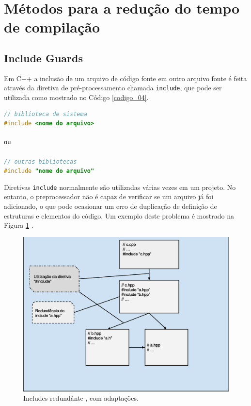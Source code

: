 \section{Métodos para a redução do tempo de compilação}

\subsection{Include Guards}\label{include_guards_section}

Em C++ a inclusão de um arquivo de código fonte em outro arquivo fonte é feita
 através da diretiva de pré-processamento chamada \texttt{include}, que pode 
ser utilizada como mostrado no Código \ref{codigo_04}. 

\begin{lstlisting}[language=C++,caption={Diretiva de 
                           pré-processamento para inclusão de arquivo},
                                                   label=codigo_04]
// biblioteca de sistema 
#include <nome do arquivo>  

ou

// outras bibliotecas 
#include "nome do arquivo"  

\end{lstlisting}


Diretivas \texttt{include} normalmente são utilizadas várias vezes em um projeto.
 No entanto, o preprocessador não é capaz de verificar se um arquivo já foi
 adicionado, o que pode ocasionar um erro de duplicação de definição de
 estruturas e elementos do código. Um exemplo deste problema é mostrado na
 Figura \ref{fig07} \cite[pág. 57]{ref39}.

\begin{figure}[h]
    \centering
        \includegraphics[keepaspectratio=true,scale=0.55]{figuras/multi_include.eps}
    \caption{Includes redundânte \cite[pág.  80]{ref42}, com adaptações.}
    \label{fig07}
\end{figure}


